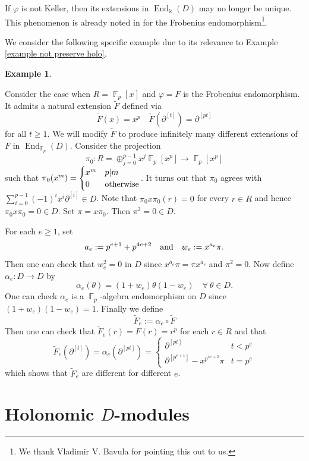 \documentclass[11pt]{amsart}
\theoremstyle{definition}
\newtheorem{example}[theorem]{Example}
\theoremstyle{remark}
\numberwithin{equation}{subsection}
\DeclareMathOperator{\kk}{\Bbbk}
\DeclareMathOperator{\FF}{\mathbb{F}}
\DeclareMathOperator{\End}{End}
\begin{document}
If $\varphi$ is not Keller, then its extensions in $\End_{\kk}(D)$ may no longer be unique. This phenomenon is already noted in \cite{BavulaExtensionFrobenius} for the Frobenius endomorphism\footnote{We thank Vladimir V. Bavula for pointing this out to us.}.

We consider the following specific example due to its relevance to Example \ref{example not preserve holo}.
\begin{example}
\label{ex: infinite extension of Frob}

Consider the case when $R=\FF_p[x]$ and $\varphi=F$ is the Frobenius endomorphism. It admits a natural extension $\tilde{F}$ defined via
\[\tilde{F}(x)=x^p\quad \tilde{F}(\partial^{[t]})=\partial^{[pt]}\]
for all $t\geq 1$. We will modify $\tilde{F}$ to produce infinitely many different extensions of $F$ in $\End_{\FF_p}(D)$. 
Consider the projection 
\[\pi_0: R=\oplus_{j=0}^{p-1}x^j\FF_p[x^p]\to \FF_p[x^p]\] 
such that $\pi_0(x^m)=\begin{cases} x^m& p|m\\ 0 & {\rm otherwise}\end{cases}$. It turns out that $\pi_0$ agrees with $\sum_{i=0}^{p-1}(-1)^ix^i\partial^{[i]}\in D$. Note that $\pi_0x\pi_0(r)=0$ for every $r\in R$ and hence $\pi_0x\pi_0=0\in D$. Set $\pi=x\pi_0$. Then $\pi^2=0\in D$.

For each $e\geq 1$, set 
\[a_e:=p^{e+1}+p^{4e+2}\quad {\rm and} \quad w_e:=x^{a_e}\pi.\] 
Then one can check that $w^2_e=0$ in $D$ since $x^{a_e}\pi=\pi x^{a_e}$ and $\pi^2=0$. Now define $\alpha_e:D\to D$ by 
\[\alpha_e(\theta)=(1+w_e)\theta(1-w_e)\quad \forall\ \theta\in D.\] 
One can check $\alpha_e$ is a $\FF_p$-algebra endomorphism on $D$ since $(1+w_e)(1-w_e)=1$. Finally we define
\[\tilde{F}_e:=\alpha_e\circ \tilde{F}\]
Then one can check that $\tilde{F}_e(r)=F(r)=r^p$ for each $r\in R$ and that 
\begin{equation}
\label{alpha on small t}
\tilde{F}_e(\partial^{[t]})=\alpha_e(\partial^{[pt]})=\begin{cases}\partial^{[pt]}& t<p^e\\ \partial^{[p^{e+1}]} - x^{p^{4e+2}}\pi& t=p^e\end{cases}
\end{equation}
which shows that $\tilde{F}_e$ are different for different $e$.
\end{example}



\section{Holonomic $D$-modules}
\label{sec: holonomic}
\end{document}
